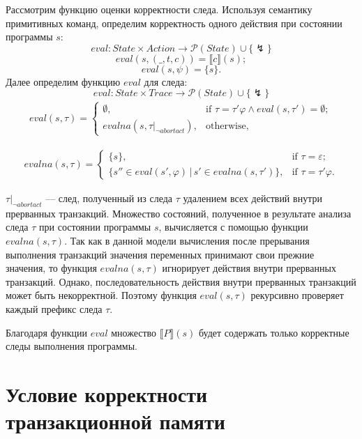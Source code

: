 Рассмотрим функцию оценки корректности следа. Используя семантику примитивных команд, определим корректность одного действия при состоянии программы $s$:
$$eval: State \times Action \to \mathcal{P}(State) \cup \{ \lightning\} $$
$$eval(s,(\_,t,c)) = \llbracket c\rrbracket (s);$$
$$eval(s,\psi) = \{s\}.$$
Далее определим функцию $eval$ для следа:
$$eval: State \times Trace \to \mathcal{P}(State) \cup \{ \lightning\} $$
\begin{align*}
  eval(s,\tau)=\begin{cases}
    \emptyset, & \text{if $\tau = \tau'\varphi \land eval(s, \tau') = \emptyset$};\\
    evalna(s, \tau |_{\neg abortact}), & \text{otherwise},
  \end{cases}
\end{align*}

\begin{align*}
     evalna(s,\tau)=\begin{cases}
    \{s\}, & \text{if $\tau =  \varepsilon$};\\ 
     \{s'' \in eval(s', \varphi) \, | \, s' \in  evalna(s, \tau') \}, & \text{if $\tau = \tau'\varphi$}.
   \end{cases}
  \end{align*}

$\tau |_{\neg abortact}$ --- след, полученный из следа $\tau$ удалением всех действий внутри прерванных транзакций. Множество состояний, полученное в результате анализа следа $\tau$ при состоянии программы $s$, вычисляется с помощью функции $evalna(s, \tau)$. Так как в данной модели вычисления после прерывания выполнения транзакций значения переменных принимают свои прежние значения, то функция $evalna(s, \tau)$ игнорирует действия внутри прерванных транзакций. Однако, последовательность действия внутри прерванных транзакций может быть некорректной. Поэтому функция $eval(s,\tau)$ рекурсивно проверяет каждый префикс следа $\tau$.

Благодаря функции $eval$ множество $\llbracket P \rrbracket(s)$ будет содержать только корректные следы выполнения программы.

\chapter{Условие корректности транзакционной памяти}

